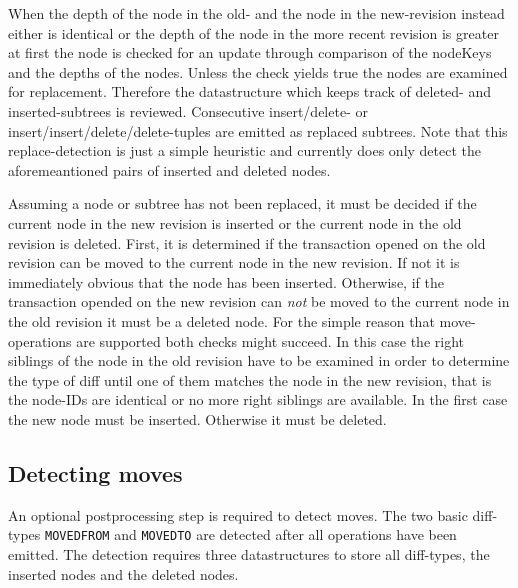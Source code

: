 When the depth of the node in the old- and the node in the new-revision instead either is identical or the depth of the node in the more recent revision is greater at first the node is checked for an update through comparison of the nodeKeys and the depths of the nodes. Unless the check yields true the nodes are examined for replacement. Therefore the datastructure which keeps track of deleted- and inserted-subtrees is reviewed. Consecutive insert/delete- or insert/insert/delete/delete-tuples are emitted as replaced subtrees. Note that this replace-detection is just a simple heuristic and currently does only detect the aforemeantioned pairs of inserted and deleted nodes.%

Assuming a node or subtree has not been replaced, it must be decided if the current node in the new revision is inserted or the current node in the old revision is deleted. First, it is determined if the transaction opened on the old revision can be moved to the current node in the new revision. If not it is immediately obvious that the node has been inserted. Otherwise, if the transaction opended on the new revision can \emph{not} be moved to the current node in the old revision it must be a deleted node. For the simple reason that move-operations are supported both checks might succeed. In this case the right siblings of the node in the old revision have to be examined in order to determine the type of diff until one of them matches the node in the new revision, that is the node-IDs are identical or no more right siblings are available. In the first case the new node must be inserted. Otherwise it must be deleted.

\subsection{Detecting moves}
An optional postprocessing step is required to detect moves. The two basic diff-types \texttt{MOVEDFROM} and \texttt{MOVEDTO} are detected after all operations have been emitted. The detection requires three datastructures to store all diff-types, the inserted nodes and the deleted nodes.

